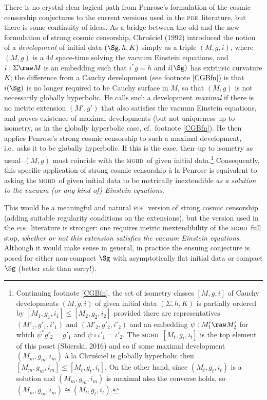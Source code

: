\documentclass[12pt]{article}
\newcommand{\mghd}{\textsc{mghd}}
\newcommand{\pde}{\textsc{pde}}
\begin{document}
There is no  crystal-clear logical path from Penrose's formulation of the  cosmic censorship conjectures to the current versions used in the \pde\ literature, but there is some continuity of ideas. As a bridge between the old and the new formulation of strong cosmic censorship, Chru\'{s}ciel (1992) introduced the notion of a 
 \emph{development} of initial data $(\Sg,h,K)$ simply as a triple $(M,g,i)$, where $(M,g)$ is a $4d$ space-time solving the vacuum Einstein equations, and $i:\Sigma\raw M$ is an embedding such that $i^*g=h$ and $i(\Sg)$ has extrinsic curvature  $K$;
 the difference from a Cauchy development (see  footnote \ref{CGBfn}) is that 
 $i(\Sg)$ is no longer required to be Cauchy surface in $M$, so that $(M,g)$ is not necessarily globally hyperbolic.
 He calls such a development \emph{maximal} if there is no metric extension $(M',g')$ that also satisfies the vacuum
Einstein equations, and proves existence of maximal developments (but not uniqueness up to isometry, as in  the globally hyperbolic case, cf.\ footnote \ref{CGBfn}). He then applies Penrose's strong cosmic censorship to such a maximal development, i.e.\ asks it to be globally hyperbolic. If this is the case, then--up to isometry as usual--$(M,g)$  must coincide with the  \mghd\ of  given initial data.\footnote{Continuing footnote \ref{CGBfn}, the set of isometry classes $[M,g,i]$ of Cauchy developments $(M,g,i)$ of given initial data $(\Sigma, h,K)$ is partially ordered by $[M_1,g_1,i_1]\leq [M_2,g_2,i_2]$ provided there are representatives $(M'_1,g'_1,i'_1)$ and $(M'_2,g'_2,i'_2)$  and an embedding $\psi:M'_1\raw M'_2$ for which $\psi^*g'_2=g'_1$ and $\psi\circ\iota'_1=\iota'_2$. The \mghd\ $[M_t,g_t,i_t]$ is the top element of this poset (Sbierski, 2016) and so
if some maximal development  $(M_m,g_m,i_m)$ \`{a} la Chru\'{s}ciel is globally hyperbolic then 
$[M_m,g_m,i_m]\leq [M_t,g_t,i_t]$. On the other hand, since $(M_t,g_t,i_t)$ is a solution and $(M_m,g_m,i_m)$ is
maximal also the converse holds, so $(M_m,g_m,i_m)\cong  (M_t,g_t,i_t)$.}
 Consequently, this specific application of 
strong cosmic censorship \`{a} la Penrose is equivalent to
 asking  the \mghd\ of  given initial data to be metrically inextendible \emph{as a solution to the vacuum (or any kind of) Einstein equations}. 
 
 This would be a meaningful and natural \pde\ version of strong cosmic censorship (adding suitable regularity conditions on the  extensions),
 but the version used in the \pde\ literature is stronger: one requires metric inextendibility of the \mghd\ full stop, \emph{whether or not this extension satisfies the vacuum Einstein equations}. Although it would make sense in general, 
 in practice the ensuing conjecture is posed for either non-compact $\Sg$ with asymptotically flat initial data or compact $\Sg$ (better safe than sorry!).
 
\end{document}
